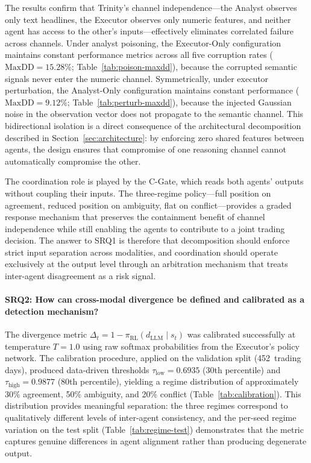 The results confirm that Trinity's channel independence---the Analyst observes
only text headlines, the Executor observes only numeric features, and neither
agent has access to the other's inputs---effectively eliminates correlated
failure across channels. Under analyst poisoning, the Executor-Only
configuration maintains constant performance metrics across all five corruption
rates ($\text{MaxDD} = 15.28\%$; Table~\ref{tab:poison-maxdd}), because the
corrupted semantic signals never enter the numeric channel. Symmetrically,
under executor perturbation, the Analyst-Only configuration maintains constant
performance ($\text{MaxDD} = 9.12\%$; Table~\ref{tab:perturb-maxdd}), because
the injected Gaussian noise in the observation vector does not propagate to
the semantic channel. This bidirectional isolation is a direct consequence of
the architectural decomposition described in Section~\ref{sec:architecture}:
by enforcing zero shared features between agents, the design ensures that
compromise of one reasoning channel cannot automatically compromise the other.

The coordination role is played by the C-Gate, which reads both agents' outputs
without coupling their inputs. The three-regime policy---full position on
agreement, reduced position on ambiguity, flat on conflict---provides a graded
response mechanism that preserves the containment benefit of channel
independence while still enabling the agents to contribute to a joint trading
decision. The answer to SRQ1 is therefore that decomposition should enforce
strict input separation across modalities, and coordination should operate
exclusively at the output level through an arbitration mechanism that treats
inter-agent disagreement as a risk signal.

\paragraph{SRQ2: How can cross-modal divergence be defined and calibrated
as a detection mechanism?}

The divergence metric $\Delta_t = 1 - \pi_{\text{RL}}(d_{\text{LLM}} \mid
s_t)$ was calibrated successfully at temperature $T = 1.0$ using raw softmax
probabilities from the Executor's policy network. The calibration procedure,
applied on the validation split (452~trading days), produced data-driven
thresholds $\tau_{\text{low}} = 0.6935$ (30th percentile) and
$\tau_{\text{high}} = 0.9877$ (80th percentile), yielding a regime
distribution of approximately 30\% agreement, 50\% ambiguity, and 20\%
conflict (Table~\ref{tab:calibration}). This distribution provides meaningful
separation: the three regimes correspond to qualitatively different levels of
inter-agent consistency, and the per-seed regime variation on the test split
(Table~\ref{tab:regime-test}) demonstrates that the metric captures genuine
differences in agent alignment rather than producing degenerate output.

